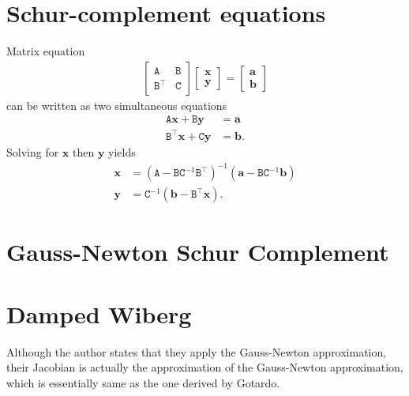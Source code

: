 \documentclass[runningheads]{llncs}
\def\tr{^\top}
\def\m#1{\ensuremath{\mathtt{#1}}}
\def\mt#1{\ensuremath{\mathtt{\tilde{#1}}}}
\def\v#1{\ensuremath{\mathbf{#1}}}
\begin{document}
\section{Schur-complement equations}
Matrix equation
\begin{align}
\begin{bmatrix}
\m A & \m B \\ \m B \tr & \m C
\end{bmatrix}
\begin{bmatrix}
\v x \\ \v y
\end{bmatrix} =
\begin{bmatrix}
\v a \\ \v b
\end{bmatrix}
\end{align}
can be written as two simultaneous equations
\begin{align}
\m A \v x + \m B \v y &= \v a \\
\m B \tr \v x + \m C \v y &= \v b.
\end{align}
Solving for $\v x$ then $\v y$ yields
\begin{align}
\v x & = (\m A - \m B \m C^{-1} \m B \tr)^{-1}
				(\v a - \m B \m C^{-1} \v b) \\
\v y &= \m C^{-1} (\v b - \m B \tr \v x).
\end{align}

\def\real{\mathbb R}

\def\m{\mathbf m}
\def\w{\mathbf w}
\def\v{\mathbf v}

\def\mt{\mathbf{\tilde m}}

\def\W{\mathtt W}
\def\I{\mathtt I}
\def\M{\mathtt M}
\def\U{\mathtt U}
\def\Q{\mathtt Q}

\def\Ut{\mathtt{\tilde U}}
\def\Wt{\mathtt{\tilde W}}
\def\V{\mathtt V}

\def\col{\operatorname{col}}

\def\t{^\top}

\newpage
\section{Gauss-Newton Schur Complement}

\section{Damped Wiberg}
Although the author states that they apply the Gauss-Newton approximation, their Jacobian is actually the approximation of the Gauss-Newton approximation, which is essentially same as the one derived by Gotardo.
 
\end{document}
